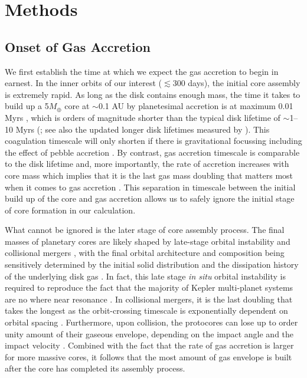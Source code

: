 \documentclass[twocolumn]{aastex631}
\begin{document}
\section{Methods}
\label{sec:methods}

\subsection{Onset of Gas Accretion}
\label{ssec:onset_accr}

We first establish the time at which we expect the gas accretion to begin in earnest. In the inner orbits of our interest ($\lesssim$300 days), the initial core assembly is extremely rapid. As long as the disk contains enough mass, the time it takes to build up a 5$M_\oplus$ core at $\sim$0.1 AU by planetesimal accretion is at maximum 0.01 Myrs \citep[e.g., see][their equations 1 \& 2]{Lee14}, which is orders of magnitude shorter than the typical disk lifetime of $\sim$1--10 Myrs (\citealt{Mamajek09}; see also the updated longer disk lifetimes measured by \citealt{Michel21}). This coagulation timescale will only shorten if there is gravitational focussing \citep[e.g.,][]{Goldreich04} including the effect of pebble accretion \citep{Ormel10,Lambrechts14}. By contrast, gas accretion timescale is comparable to the disk lifetime and, more importantly, the rate of accretion increases with core mass \citep[e.g.,][]{Lee15} which implies that it is the last gas mass doubling that matters most when it comes to gas accretion \citep[see also][]{Piso14}. This separation in timescale between the initial build up of the core and gas accretion allows us to safely ignore the initial stage of core formation in our calculation.

What cannot be ignored is the later stage of core assembly process. The final masses of planetary cores are likely shaped by late-stage orbital instability and collisional mergers \citep[e.g.,][]{Kokubo98,Kominami02,Hansen12,Hansen13}, with the final orbital architecture and composition being sensitively determined by the initial solid distribution \citep[e.g.,][]{Dawson15,Moriarty16} and the dissipation history of the underlying disk gas \citep[e.g.,][]{Dawson16}. In fact, this late stage \textit{in situ} orbital instability is required to reproduce the fact that the majority of Kepler multi-planet systems are no where near resonance \cite[][see also \citealt{Swain19} for a hint of density enhancement by collisions]{Izidoro17}. In collisional mergers, it is the last doubling that takes the longest as the orbit-crossing timescale is exponentially dependent on orbital spacing \citep[e.g.,][]{Zhou07}. Furthermore, upon collision, the protocores can lose up to order unity amount of their gaseous envelope, depending on the impact angle and the impact velocity \citep[e.g.,][]{Inamdar16}. Combined with the fact that the rate of gas accretion is larger for more massive cores, it follows that the most amount of gas envelope is built after the core has completed its assembly process. 
\end{document}
